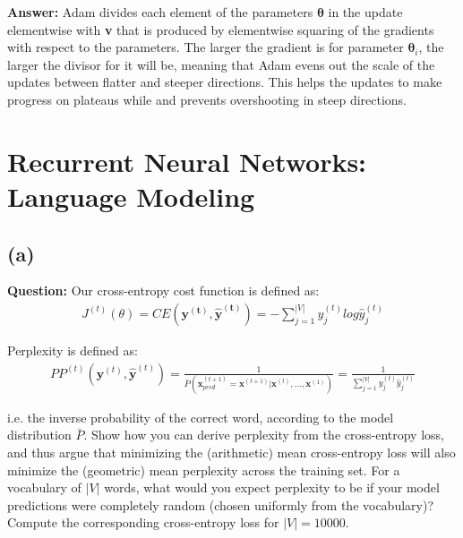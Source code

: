 \documentclass[11pt]{article}
\begin{document}
\textbf{Answer:}
Adam divides each element of the parameters $\bm{\theta}$ in the update elementwise with \textbf{v} that is produced by elementwise squaring of the gradients with respect to the parameters. The larger the gradient is for parameter $\bm{\theta}_i$, the larger the divisor for it will be, meaning that Adam evens out the scale of the updates between flatter and steeper directions. This helps the updates to make progress on plateaus while and prevents overshooting in steep directions.

\section{Recurrent Neural Networks: Language Modeling}
\subsection*{(a)}
\textbf{Question:}
Our cross-entropy cost function is defined as:
\begin{equation*}
  \begin{split}
    J^{(t)}(\theta) = CE(\mathbf{y^{(t)}}, \mathbf{\hat{y}^{(t)}}) = - \sum_{j=1}^{|V|}{ y_{j}^{(t)} log\hat{y}_{j}^{(t)} }
  \end{split}
\end{equation*}

Perplexity is defined as:
\begin{equation*}
  \begin{split}
    PP^{(t)}(\mathbf{y}^{(t)}, \mathbf{\hat{y}}^{(t)}) = \frac{ 1 }{ \bar{P}(\mathbf{x}_{pred}^{(t+1)} = \mathbf{x}^{(t+1)} | \mathbf{x}^{(t)}, ..., \mathbf{x}^{(1)}) } = \frac{ 1 }{ \sum_{j=1}^{|V|}{ y_{j}^{(t)} \hat{y}_{j}^{(t)} } }
  \end{split}
\end{equation*}

i.e. the inverse probability of the correct word, according to the model distribution $\bar{P}$. Show how you can derive perplexity from the cross-entropy loss, and thus argue that minimizing the (arithmetic) mean cross-entropy loss will also minimize the (geometric) mean perplexity across the training set. For a vocabulary of $|V|$ words, what would you expect perplexity to be if your model predictions were completely random (chosen uniformly from the vocabulary)? Compute the corresponding cross-entropy loss for $|V| = 10000$.
\end{document}
